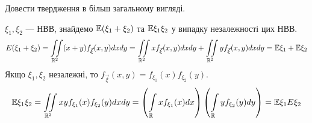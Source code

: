 \begin{exercise}
    Довести твердження в більш загальному вигляді.
\end{exercise}

\begin{example}\label{proof:expectation}
    $\xi_1, \xi_2$ --- НВВ, знайдемо $\mathbb{E}(\xi_1 + \xi_2)$ та $\mathbb{E}\xi_1\xi_2$
    у випадку незалежності цих НВВ.
    $$E(\xi_1 + \xi_2) = \iint\limits_{\mathbb{R}^2} (x+y) f_{\vec{\xi}}(x,y) dx dy = 
    \iint\limits_{\mathbb{R}^2} x f_{\vec{\xi}}(x,y) dx dy + 
    \iint\limits_{\mathbb{R}^2} y f_{\vec{\xi}}(x,y) dx dy = \mathbb{E}\xi_1 + \mathbb{E}\xi_2$$
    Якщо $\xi_1, \xi_2$ незалежні, то $f_{\vec{\xi}}(x,y) = f_{\xi_1}(x) f_{\xi_2}(y)$.
    $$\mathbb{E}\xi_1 \xi_2 =
    \iint\limits_{\mathbb{R}^2} xy f_{\xi_1}(x) f_{\xi_2}(y) dx dy =
    \left( \int\limits_{\mathbb{R}} x f_{\xi_1}(x) dx \right)
    \left( \int\limits_{\mathbb{R}} y f_{\xi_2}(y) dy \right) = \mathbb{E}\xi_1 E\xi_2$$
\end{example}
